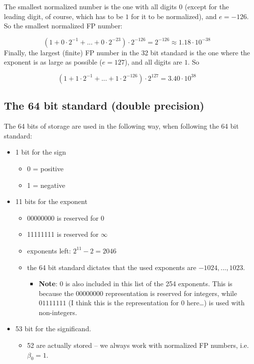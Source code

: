 \documentclass[]{book}
\providecommand{\tightlist}{%
  \setlength{\itemsep}{0pt}\setlength{\parskip}{0pt}}
\theoremstyle{definition}
\theoremstyle{definition}
\theoremstyle{definition}
\theoremstyle{remark}
\begin{document}
The smallest normalized number is the one with all digits \(0\) (except
for the leading digit, of course, which has to be \(1\) for it to be
normalized), and \(e = -126\). So the smallest normalized FP number:

\[
\left(1 + 0\cdot 2^{-1} + ... + 0\cdot 2^{-23}\right)\cdot 2^{-126} = 2^{-126} \approx 1.18\cdot 10^{-38}
\] Finally, the largest (finite) FP number in the 32 bit standard is the
one where the exponent is as large as possible (\(e = 127\)), and all
digits are \(1\). So

\[
\left(1 + 1\cdot 2^{-1} + ... + 1\cdot 2^{-126}\right)\cdot 2^{127} = 3.40\cdot 10^{38}
\]

\subsection{The 64 bit standard (double
precision)}\label{the-64-bit-standard-double-precision}

The 64 bits of storage are used in the following way, when following the
64 bit standard:

\begin{itemize}
\tightlist
\item
  1 bit for the sign

  \begin{itemize}
  \tightlist
  \item
    0 = positive
  \item
    1 = negative
  \end{itemize}
\item
  11 bits for the exponent

  \begin{itemize}
  \tightlist
  \item
    00000000 is reserved for 0
  \item
    11111111 is reserved for \(\infty\)
  \item
    exponents left: \(2^11 - 2 = 2046\)
  \item
    the 64 bit standard dictates that the used exponents are
    \(-1024,...,1023\).

    \begin{itemize}
    \tightlist
    \item
      \textbf{Note}: \(0\) is also included in this list of the 254
      exponents. This is because the \(00000000\) representation is
      reserved for integers, while \(01111111\) (I think this is the
      representation for \(0\) here\ldots{}) is used with non-integers.
    \end{itemize}
  \end{itemize}
\item
  53 bit for the significand.

  \begin{itemize}
  \tightlist
  \item
    52 are actually stored -- we always work with normalized FP numbers,
    i.e. \(\beta_0 = 1\).
  \end{itemize}
\end{itemize}
\end{document}
